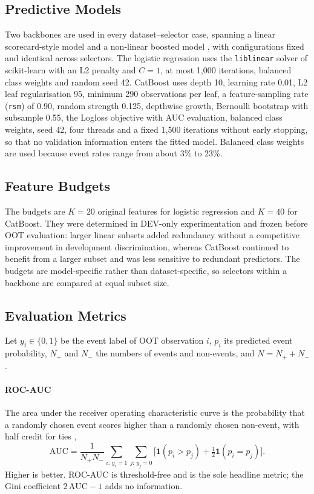 \documentclass[final,5p,twocolumn]{elsarticle}
\newcommand{\Kfeat}{K}
\newcommand{\AUC}{\mathrm{AUC}}
\begin{document}
\subsection{Predictive Models}
\label{subsec:models}

Two backbones are used in every dataset--selector case, spanning a linear scorecard-style model and a non-linear boosted model \cite{lessmann2015,gunnarsson2021}, with configurations fixed and identical across selectors. The logistic regression uses the \texttt{liblinear} solver of scikit-learn \cite{pedregosa2011} with an L2 penalty and $C=1$, at most 1,000 iterations, balanced class weights and random seed 42. CatBoost \cite{prokhorenkova2018} uses depth 10, learning rate 0.01, L2 leaf regularisation 95, minimum 290 observations per leaf, a feature-sampling rate (\texttt{rsm}) of 0.90, random strength 0.125, depthwise growth, Bernoulli bootstrap with subsample 0.55, the Logloss objective with AUC evaluation, balanced class weights, seed 42, four threads and a fixed 1,500 iterations without early stopping, so that no validation information enters the fitted model. Balanced class weights are used because event rates range from about 3\% to 23\%.

\subsection{Feature Budgets}
\label{subsec:feature_budgets}

The budgets are $\Kfeat=20$ original features for logistic regression and $\Kfeat=40$ for CatBoost. They were determined in DEV-only experimentation and frozen before OOT evaluation: larger linear subsets added redundancy without a competitive improvement in development discrimination, whereas CatBoost continued to benefit from a larger subset and was less sensitive to redundant predictors. The budgets are model-specific rather than dataset-specific, so selectors within a backbone are compared at equal subset size.

\subsection{Evaluation Metrics}
\label{subsec:metrics}

Let $y_i\in\{0,1\}$ be the event label of OOT observation $i$, $p_i$ its predicted event probability, $N_+$ and $N_-$ the numbers of events and non-events, and $N=N_++N_-$.

\paragraph{ROC-AUC}
The area under the receiver operating characteristic curve is the probability that a randomly chosen event scores higher than a randomly chosen non-event, with half credit for ties \cite{hanley1982},
\begin{equation}
    \AUC=\frac{1}{N_+N_-}\sum_{i:\,y_i=1}\sum_{j:\,y_j=0}\big[\mathbf{1}(p_i>p_j)+\tfrac12\mathbf{1}(p_i=p_j)\big].
    \label{eq:roc_auc}
\end{equation}
Higher is better. ROC-AUC is threshold-free and is the sole headline metric; the Gini coefficient $2\,\AUC-1$ adds no information.
\end{document}
